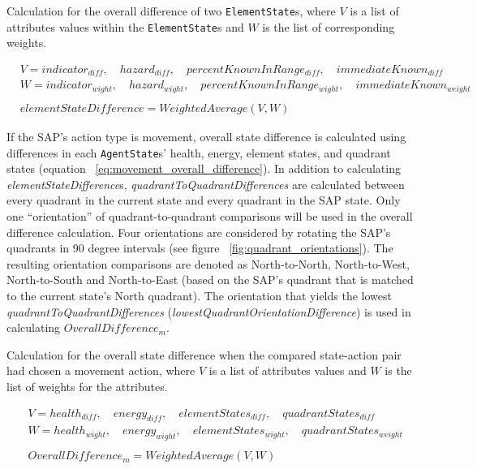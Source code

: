 \caption{Calculation for the overall difference of two \texttt{ElementState}s, where $V$ is a list of attributes values within the \texttt{ElementState}s and $W$ is the list of corresponding weights.}
\begin{equation} \label{eq:element_state_difference}
\begin{align}
  &V = {indicator_{diff},\quad hazard_{diff},\quad percentKnownInRange_{diff},\quad immediateKnown_{diff}} \\
  &W = {indicator_{wight},\quad hazard_{wight},\quad percentKnownInRange_{wight},\quad immediateKnown_{weight}} \\
  &\\
  &elementStateDifference = WeightedAverage(V,W)
\end{align}
\end{equation}

If the SAP's action type is movement, overall state difference is calculated using differences in each \texttt{AgentState}s' health, energy, element states, and quadrant states (equation ~\ref{eq:movement_overall_difference}).
In addition to calculating \textit{elementStateDifference}s, \textit{quadrantToQuadrantDifferences} are calculated between every quadrant in the current state and every quadrant in the SAP state.
Only one ``orientation'' of quadrant-to-quadrant comparisons will be used in the overall difference calculation.
Four orientations are considered by rotating the SAP's quadrants in 90 degree intervals (see figure ~\ref{fig:quadrant_orientations}).
The resulting orientation comparisons are denoted as North-to-North, North-to-West, North-to-South and North-to-East (based on the SAP's quadrant that is matched to the current state's North quadrant).
The orientation that yields the lowest \textit{quadrantToQuadrantDifferences} (\textit{lowestQuadrantOrientationDifference}) is used in calculating $OverallDifference_{m}$.

\caption{Calculation for the overall state difference when the compared state-action pair had chosen a movement action, where $V$ is a list of attributes values and $W$ is the list of weights for the attributes.}
\begin{equation} \label{eq:movement_overall_difference}
\begin{align}
  &V = {health_{diff},\quad energy_{diff},\quad elementStates_{diff},\quad quadrantStates_{diff}} \\
  &W = {health_{wight},\quad energy_{wight},\quad elementStates_{wight},\quad quadrantStates_{weight}} \\
  &\\
  &OverallDifference_{m} = WeightedAverage(V,W)
\end{align}
\end{equation}

